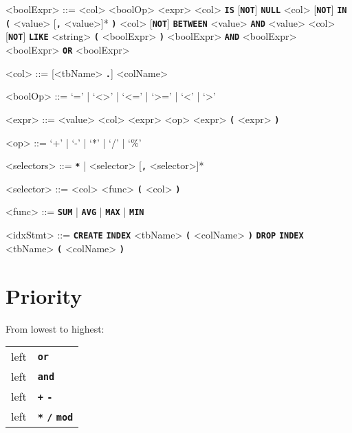 \documentclass{article}
\renewcommand{\t}[1]{\texttt{\textbf{#1}}}
\begin{document}
\begin{grammar}
<boolExpr> ::= <col> <boolOp> <expr>
\alt <col> \t{IS} [\t{NOT}] \t{NULL}
\alt <col> [\t{NOT}] \t{IN} \t{(} <value> [\t{,} <value>]* \t{)}
\alt <col> [\t{NOT}] \t{BETWEEN} <value> \t{AND} <value>
\alt <col> [\t{NOT}] \t{LIKE} <string>
\alt \t{(} <boolExpr> \t{)}
\alt <boolExpr> \t{AND} <boolExpr>
\alt <boolExpr> \t{OR} <boolExpr>

<col> ::= [<tbName> \t{.}] <colName>

<boolOp> ::= `=' | `<>' | `<=' | `>=' | `<' | `>'

<expr> ::= <value>
\alt <col>
\alt <expr> <op> <expr>
\alt \t{(} <expr> \t{)}

<op> ::= `+' | `-' | `*' | `/' | `\%'

<selectors> ::= \t{*} | <selector> [\t{,} <selector>]*

<selector> ::= <col>
\alt <func> \t{(} <col> \t{)}

<func> ::= \t{SUM} | \t{AVG} | \t{MAX} | \t{MIN}

<idxStmt> ::= \t{CREATE} \t{INDEX} <tbName> \t{(} <colName> \t{)}
\alt \t{DROP} \t{INDEX} <tbName> \t{(} <colName> \t{)}

\end{grammar}

\section{Priority}

From lowest to highest:

\begin{center}
    \begin{tabular}{cl}
        left & \t{or} \\
        left & \t{and} \\
        left & \t{+} \t{-} \\
        left & \t{*} \t{/} \t{mod} \\
    \end{tabular}
\end{center}
\end{document}

